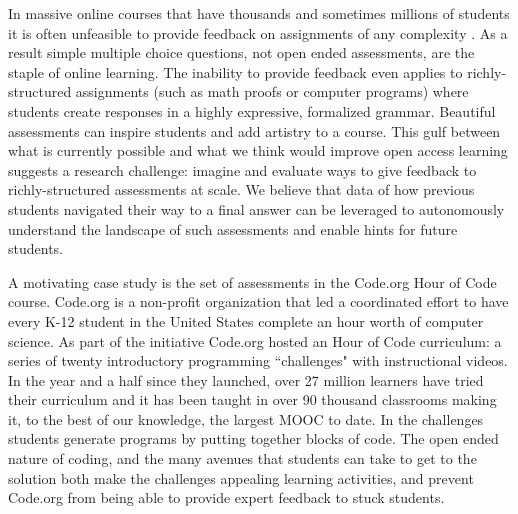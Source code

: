 In massive online courses that have thousands and sometimes millions of students it is often unfeasible to provide feedback on assignments of any complexity \cite{pappano2012year}.  As a result simple multiple choice questions, not open ended assessments, are the staple of online learning. The inability to provide feedback even applies to richly-structured assignments (such as math proofs or computer programs) where students create responses in a highly expressive, formalized grammar. Beautiful assessments can inspire students and add artistry to a course. This gulf between what is currently possible and what we think would improve open access learning suggests a research challenge: imagine and evaluate ways to give feedback to richly-structured assessments at scale. We believe that data of how previous students
navigated their way to a final answer can
be leveraged to autonomously understand the landscape of such assessments and enable hints for future students.

A motivating case study is the set of assessments in the Code.org Hour of Code course. Code.org is a non-profit organization that led a coordinated effort to have every K-12 student in the United States complete an hour worth of computer science. As part of the initiative Code.org hosted an Hour of Code curriculum: a series of twenty introductory programming ``challenges" with instructional videos. In the year and a half since they launched, over 27 million learners have tried their curriculum and it has been taught in over 90 thousand classrooms making it, to the best of our knowledge, the largest MOOC to date. In the challenges students generate programs by putting together blocks of code. The open ended nature of coding, and the many avenues that students can take to get to the solution both make the challenges appealing learning activities, and prevent Code.org from being able to provide expert feedback to stuck students. 

